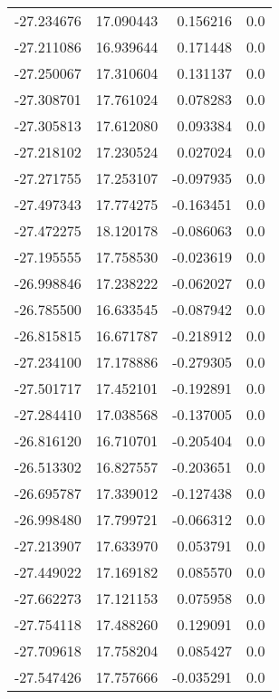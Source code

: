 \begin{tabular}{rrrr}
      -27.234676 &        17.090443 &    0.156216 &   0.0 \\
      -27.211086 &        16.939644 &    0.171448 &   0.0 \\
      -27.250067 &        17.310604 &    0.131137 &   0.0 \\
      -27.308701 &        17.761024 &    0.078283 &   0.0 \\
      -27.305813 &        17.612080 &    0.093384 &   0.0 \\
      -27.218102 &        17.230524 &    0.027024 &   0.0 \\
      -27.271755 &        17.253107 &   -0.097935 &   0.0 \\
      -27.497343 &        17.774275 &   -0.163451 &   0.0 \\
      -27.472275 &        18.120178 &   -0.086063 &   0.0 \\
      -27.195555 &        17.758530 &   -0.023619 &   0.0 \\
      -26.998846 &        17.238222 &   -0.062027 &   0.0 \\
      -26.785500 &        16.633545 &   -0.087942 &   0.0 \\
      -26.815815 &        16.671787 &   -0.218912 &   0.0 \\
      -27.234100 &        17.178886 &   -0.279305 &   0.0 \\
      -27.501717 &        17.452101 &   -0.192891 &   0.0 \\
      -27.284410 &        17.038568 &   -0.137005 &   0.0 \\
      -26.816120 &        16.710701 &   -0.205404 &   0.0 \\
      -26.513302 &        16.827557 &   -0.203651 &   0.0 \\
      -26.695787 &        17.339012 &   -0.127438 &   0.0 \\
      -26.998480 &        17.799721 &   -0.066312 &   0.0 \\
      -27.213907 &        17.633970 &    0.053791 &   0.0 \\
      -27.449022 &        17.169182 &    0.085570 &   0.0 \\
      -27.662273 &        17.121153 &    0.075958 &   0.0 \\
      -27.754118 &        17.488260 &    0.129091 &   0.0 \\
      -27.709618 &        17.758204 &    0.085427 &   0.0 \\
      -27.547426 &        17.757666 &   -0.035291 &   0.0 \\

\end{tabular}
